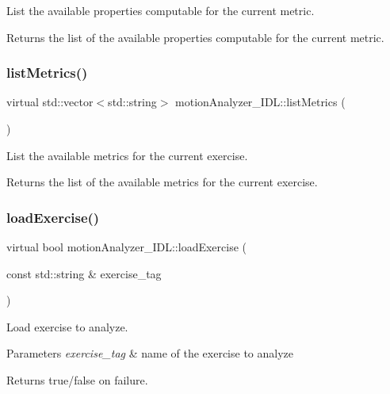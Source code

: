 List the available properties computable for the current metric. 

\begin{DoxyReturn}{Returns}
the list of the available properties computable for the current metric. 
\end{DoxyReturn}
\mbox{\label{classmotionAnalyzer__IDL_a139730029d1e7112eb66636c21fe99c8}} 
\subsubsection{\texorpdfstring{listMetrics()}{listMetrics()}}
{\footnotesize\ttfamily virtual std\+::vector$<$std\+::string$>$ motion\+Analyzer\+\_\+\+I\+D\+L\+::list\+Metrics (\begin{DoxyParamCaption}{ }\end{DoxyParamCaption})\hspace{0.3cm}{\ttfamily [virtual]}}



List the available metrics for the current exercise. 

\begin{DoxyReturn}{Returns}
the list of the available metrics for the current exercise. 
\end{DoxyReturn}
\mbox{\label{classmotionAnalyzer__IDL_a656d8a9edd690c651cb1079cfa697c10}} 
\subsubsection{\texorpdfstring{loadExercise()}{loadExercise()}}
{\footnotesize\ttfamily virtual bool motion\+Analyzer\+\_\+\+I\+D\+L\+::load\+Exercise (\begin{DoxyParamCaption}\item[{const std\+::string \&}]{exercise\+\_\+tag }\end{DoxyParamCaption})\hspace{0.3cm}{\ttfamily [virtual]}}



Load exercise to analyze. 


\begin{DoxyParams}{Parameters}
{\em exercise\+\_\+tag} & name of the exercise to analyze \\
\hline
\end{DoxyParams}
\begin{DoxyReturn}{Returns}
true/false on failure. 
\end{DoxyReturn}
\mbox{\label{classmotionAnalyzer__IDL_a7c16a7a17fa15d7bc8ef369f7de0c90f}} 
